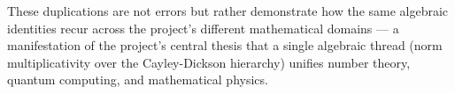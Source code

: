 \documentclass[12pt,a4paper,openany]{book}
\begin{document}
These duplications are not errors but rather demonstrate how the same algebraic identities recur across the project's different mathematical domains — a manifestation of the project's central thesis that a single algebraic thread (norm multiplicativity over the Cayley-Dickson hierarchy) unifies number theory, quantum computing, and mathematical physics.

\clearpage
\end{document}
